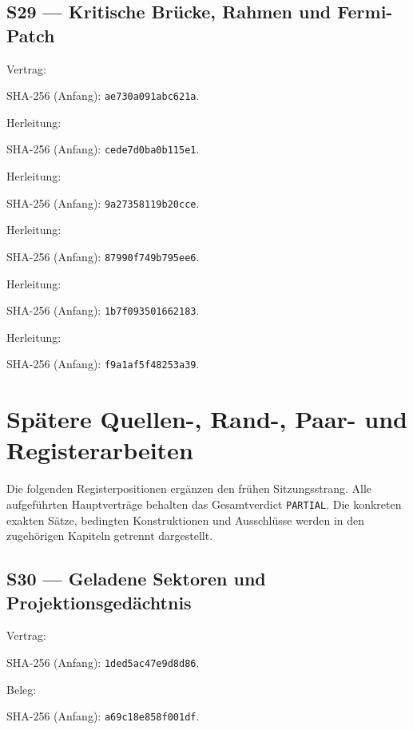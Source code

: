 \documentclass[11pt,a4paper,oneside,parskip=half,headings=normal,numbers=noenddot,bibliography=totoc]{scrreprt}
\begin{document}
\subsection*{S29 — Kritische Brücke, Rahmen und Fermi-Patch}\label{s:29}
{\small{}\par}
Vertrag: \par{\footnotesize SHA-256 (Anfang): \texttt{ae730a091abc621a}.}\par
Herleitung: \par{\footnotesize SHA-256 (Anfang): \texttt{cede7d0ba0b115e1}.}\par
Herleitung: \par{\footnotesize SHA-256 (Anfang): \texttt{9a27358119b20cce}.}\par
Herleitung: \par{\footnotesize SHA-256 (Anfang): \texttt{87990f749b795ee6}.}\par
Herleitung: \par{\footnotesize SHA-256 (Anfang): \texttt{1b7f093501662183}.}\par
Herleitung: \par{\footnotesize SHA-256 (Anfang): \texttt{f9a1af5f48253a39}.}\par
\section{Spätere Quellen-, Rand-, Paar- und Registerarbeiten}
Die folgenden Registerpositionen ergänzen den frühen Sitzungsstrang. Alle aufgeführten Hauptverträge behalten das Gesamtverdict \texttt{PARTIAL}. Die konkreten exakten Sätze, bedingten Konstruktionen und Ausschlüsse werden in den zugehörigen Kapiteln getrennt dargestellt.
\subsection*{S30 — Geladene Sektoren und Projektionsgedächtnis}\label{s:30}
{\small{}\par}
Vertrag: \par
{\footnotesize SHA-256 (Anfang): \texttt{1ded5ac47e9d8d86}.}\par
Beleg: \par
{\footnotesize SHA-256 (Anfang): \texttt{a69c18e858f001df}.}\par
\end{document}
